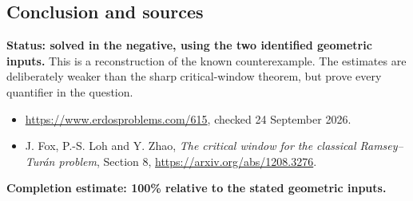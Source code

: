 \subsection*{Conclusion and sources}
\textbf{Status: solved in the negative, using the two identified geometric inputs.} This is a reconstruction of the known counterexample. The estimates are deliberately weaker than the sharp critical-window theorem, but prove every quantifier in the question.
\begin{itemize}
\item \url{https://www.erdosproblems.com/615}, checked 24 September 2026.
\item J. Fox, P.-S. Loh and Y. Zhao, \emph{The critical window for the classical Ramsey--Tur\'an problem}, Section 8, \url{https://arxiv.org/abs/1208.3276}.
\end{itemize}
\noindent\textbf{Completion estimate: 100\% relative to the stated geometric inputs.}
